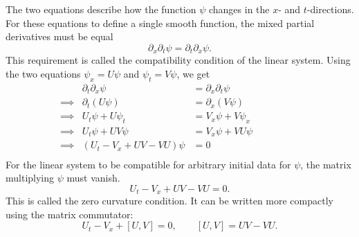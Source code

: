 \documentclass[english,master]{liumaiex}
\theoremstyle{thesisplain}
\theoremstyle{thesisdefinition}
\numberwithin{equation}{section}
\begin{document}
The two equations describe how the function $\psi$ changes in the $x$- and $t$-directions. For these equations to define a single smooth function, the mixed partial derivatives must be equal
\begin{equation}
	\partial_x \partial_t \psi = \partial_t \partial_x \psi.
\end{equation}
This requirement is called the compatibility condition of the linear system. Using the two equations $\psi_x=U\psi$ and $\psi_t=V\psi$, we get
\begin{equation}
\begin{aligned}
	& & \partial_t \partial_x \psi &= \partial_x \partial_t \psi \qquad \qquad \qquad \qquad \\
	& \implies & \partial_t (U \psi) &= \partial_x (V \psi) \\
	& \implies & U_t \psi + U \psi_t &= V_x \psi + V \psi_x \\
	& \implies & U_t \psi + U V \psi &= V_x \psi + V U \psi \\
	& \implies & (U_t - V_x + U V - V U) \psi &= 0 \\
\end{aligned}
\end{equation}
For the linear system to be compatible for arbitrary initial data for $\psi$, the matrix multiplying $\psi$ must vanish.
\begin{equation}
	U_t - V_x + U V - V U = 0.
\end{equation}
This is called the zero curvature condition. It can be written more compactly using the matrix commutator:
\begin{equation}
	U_t - V_x + [U,V] = 0,
	\qquad [U,V]=UV-VU.
\end{equation}
\end{document}
